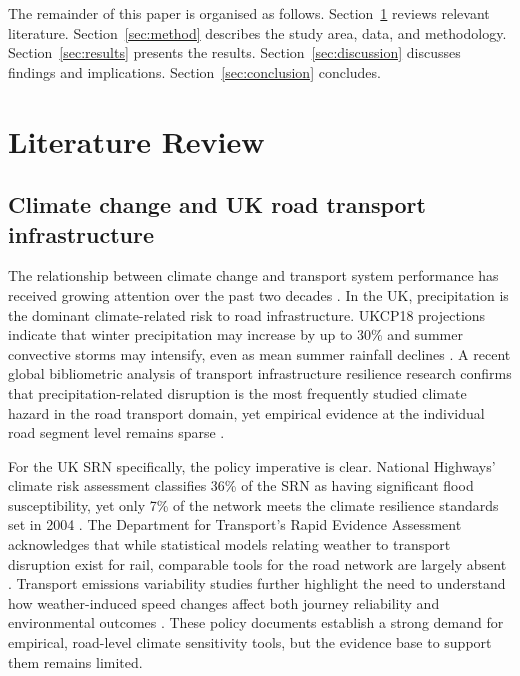 \documentclass[review]{elsarticle}
\begin{document}
The remainder of this paper is organised as follows. Section~\ref{sec:lit} reviews relevant literature. Section~\ref{sec:method} describes the study area, data, and methodology. Section~\ref{sec:results} presents the results. Section~\ref{sec:discussion} discusses findings and implications. Section~\ref{sec:conclusion} concludes.


\section{Literature Review}
\label{sec:lit}

\subsection{Climate change and UK road transport infrastructure}
\label{sec:lit:climate}

The relationship between climate change and transport system performance has received growing attention over the past two decades \citep{koetse2009impact,jaroszweski2010effect,stern2007contribution}. In the UK, precipitation is the dominant climate-related risk to road infrastructure. UKCP18 projections indicate that winter precipitation may increase by up to 30\% and summer convective storms may intensify, even as mean summer rainfall declines \citep{ukcp18}. A recent global bibliometric analysis of transport infrastructure resilience research confirms that precipitation-related disruption is the most frequently studied climate hazard in the road transport domain, yet empirical evidence at the individual road segment level remains sparse \citep{zhou2026bibliometric}.

For the UK SRN specifically, the policy imperative is clear. National Highways' climate risk assessment classifies 36\% of the SRN as having significant flood susceptibility, yet only 7\% of the network meets the climate resilience standards set in 2004 \citep{nce2026srn,nh2024climate}. The Department for Transport's Rapid Evidence Assessment acknowledges that while statistical models relating weather to transport disruption exist for rail, comparable tools for the road network are largely absent \citep{dft2024rea}. Transport emissions variability studies further highlight the need to understand how weather-induced speed changes affect both journey reliability and environmental outcomes \citep{wan2025variability}. These policy documents establish a strong demand for empirical, road-level climate sensitivity tools, but the evidence base to support them remains limited.
\end{document}
